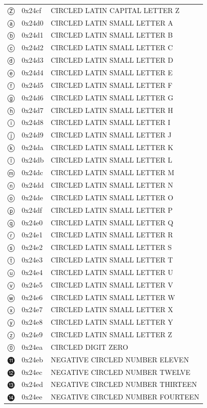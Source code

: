 \documentclass[12pt, twoside]{article}
\begin{document}
\begin{longtable}{L{1.0cm} L{2.0cm} >{\footnotesize}L{10cm}}
$Ⓩ$&0x24cf&CIRCLED LATIN CAPITAL LETTER Z\\
$ⓐ$&0x24d0&CIRCLED LATIN SMALL LETTER A\\
$ⓑ$&0x24d1&CIRCLED LATIN SMALL LETTER B\\
$ⓒ$&0x24d2&CIRCLED LATIN SMALL LETTER C\\
$ⓓ$&0x24d3&CIRCLED LATIN SMALL LETTER D\\
$ⓔ$&0x24d4&CIRCLED LATIN SMALL LETTER E\\
$ⓕ$&0x24d5&CIRCLED LATIN SMALL LETTER F\\
$ⓖ$&0x24d6&CIRCLED LATIN SMALL LETTER G\\
$ⓗ$&0x24d7&CIRCLED LATIN SMALL LETTER H\\
$ⓘ$&0x24d8&CIRCLED LATIN SMALL LETTER I\\
$ⓙ$&0x24d9&CIRCLED LATIN SMALL LETTER J\\
$ⓚ$&0x24da&CIRCLED LATIN SMALL LETTER K\\
$ⓛ$&0x24db&CIRCLED LATIN SMALL LETTER L\\
$ⓜ$&0x24dc&CIRCLED LATIN SMALL LETTER M\\
$ⓝ$&0x24dd&CIRCLED LATIN SMALL LETTER N\\
$ⓞ$&0x24de&CIRCLED LATIN SMALL LETTER O\\
$ⓟ$&0x24df&CIRCLED LATIN SMALL LETTER P\\
$ⓠ$&0x24e0&CIRCLED LATIN SMALL LETTER Q\\
$ⓡ$&0x24e1&CIRCLED LATIN SMALL LETTER R\\
$ⓢ$&0x24e2&CIRCLED LATIN SMALL LETTER S\\
$ⓣ$&0x24e3&CIRCLED LATIN SMALL LETTER T\\
$ⓤ$&0x24e4&CIRCLED LATIN SMALL LETTER U\\
$ⓥ$&0x24e5&CIRCLED LATIN SMALL LETTER V\\
$ⓦ$&0x24e6&CIRCLED LATIN SMALL LETTER W\\
$ⓧ$&0x24e7&CIRCLED LATIN SMALL LETTER X\\
$ⓨ$&0x24e8&CIRCLED LATIN SMALL LETTER Y\\
$ⓩ$&0x24e9&CIRCLED LATIN SMALL LETTER Z\\
$⓪$&0x24ea&CIRCLED DIGIT ZERO\\
$⓫$&0x24eb&NEGATIVE CIRCLED NUMBER ELEVEN\\
$⓬$&0x24ec&NEGATIVE CIRCLED NUMBER TWELVE\\
$⓭$&0x24ed&NEGATIVE CIRCLED NUMBER THIRTEEN\\
$⓮$&0x24ee&NEGATIVE CIRCLED NUMBER FOURTEEN\\

\end{longtable}
\end{document}
